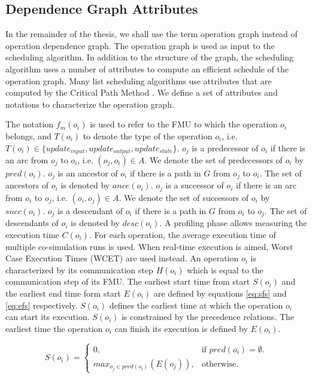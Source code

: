 \subsection{Dependence Graph Attributes}

In the remainder of the thesis, we shall use the term operation graph instead of operation dependence graph. The operation graph is used as input to the scheduling algorithm. In addition to the structure of the graph, the scheduling algorithm uses a number of attributes to compute an efficient schedule of the operation graph. Many list scheduling algorithms use attributes that are computed by the Critical Path Method \cite{}. We define a set of attributes and notations to characterize the operation graph.

The notation $f_m(o_i)$ is used to refer to the FMU to which the operation $o_i$ belongs, and $T(o_i)$ to denote the type of the operation $o_i$, i.e. $T(o_i) \in \{update_{input}, update_{output}, update_{state}\}$. $o_j$ is a predecessor of $o_i$ if there is an arc from $o_j$ to $o_i$, i.e. $(o_j, o_i) \in A$. We denote the set of predecessors of $o_i$ by $pred(o_i)$. $o_j$ is an ancestor of $o_i$ if there is a path in $G$ from $o_j$ to $o_i$. The set of ancestors of $o_i$ is denoted by $ance(o_i)$. $o_j$ is a successor of $o_i$ if there is an arc from $o_i$ to $o_j$, i.e. $(o_i, o_j) \in A$. We denote the set of successors of $o_i$ by $succ(o_i)$. $o_j$ is a descendant of $o_i$ if there is a path in $G$ from $o_i$ to $o_j$. The set of descendants of $o_i$ is denoted by $desc(o_i)$. A profiling phase allows measuring the execution time $C(o_i)$. For each operation, the average execution time of multiple co-simulation runs is used. When real-time execution is aimed, Worst Case Execution Times (WCET) are used instead. An operation $o_i$ is characterized by its communication step $H(o_i)$ which is equal to the communication step of its FMU. The earliest start time from start $S(o_i)$ and the earliest end time form start $E(o_i)$ are defined by equations \ref{eq:sfs} and \ref{eq:efs} respectively. $S(o_i)$ defines the earliest time at which the operation $o_i$ can start its execution. $S(o_i)$ is constrained by the precedence relations. The earliest time the operation $o_i$ can finish its execution is defined by $E(o_i)$.

\begin{equation}
S(o_i)=\begin{cases}
    0, & \text{if $pred(o_i)=\emptyset$}.\\
    max_{o_j \in pred(o_i)}(E(o_j)), & \text{otherwise}.
  \end{cases}
	\label{eq:sfs}
\end{equation}

